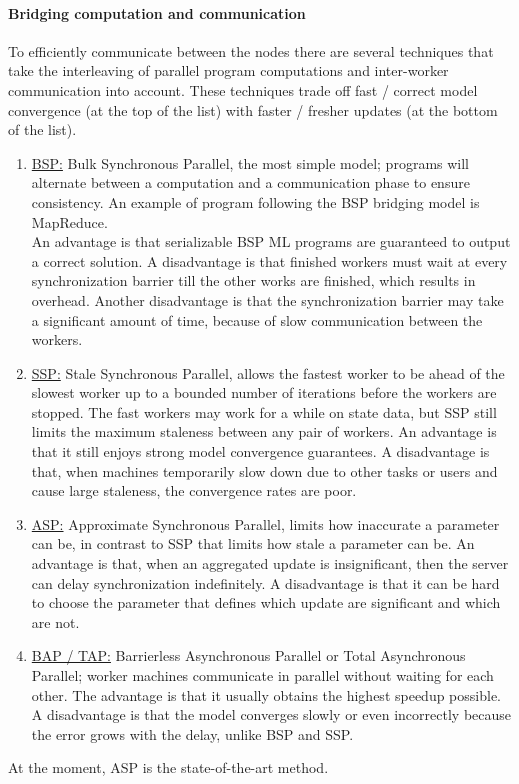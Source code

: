 \paragraph{Bridging computation and communication}
To efficiently communicate between the nodes there are several techniques that take the interleaving of parallel program computations and inter-worker communication into account. These techniques trade off fast / correct model convergence (at the top of the list) with faster / fresher updates (at the bottom of the list).
\begin{enumerate}
	\item \underline{BSP:} Bulk Synchronous Parallel, the most simple model; programs will alternate between a computation and a communication phase to ensure consistency\cite{Xing16}. An example of program following the BSP bridging model is MapReduce.\\
	An advantage is that serializable BSP ML programs are guaranteed to output a correct solution. A disadvantage is that finished workers must wait at every synchronization barrier till the other works are finished, which results in overhead\cite{Chilimbi14}. Another disadvantage is that the synchronization barrier may take a significant amount of time, because of slow communication between the workers.
	\item \underline{SSP:} Stale Synchronous Parallel, allows the fastest worker to be ahead of the slowest worker up to a bounded number of iterations before the workers are stopped. The fast workers may work for a while on state data, but SSP still limits the maximum staleness between any pair of workers. An advantage is that it still enjoys strong model convergence guarantees. A disadvantage is that, when machines temporarily slow down due to other tasks or users and cause large staleness, the convergence rates are poor.
	\item \underline{ASP:} Approximate Synchronous Parallel, limits how inaccurate a parameter can be, in contrast to SSP that limits how stale a parameter can be. An advantage is that, when an aggregated update is insignificant, then the server can delay synchronization indefinitely. A disadvantage is that it can be hard to choose the parameter that defines which update are significant and which are not. \cite{Hsieh17}
	\item \underline{BAP / TAP:} Barrierless Asynchronous Parallel\cite{Han15} or Total Asynchronous Parallel\cite{Hsieh17}; worker machines communicate in parallel without waiting for each other. The advantage is that it usually obtains the highest speedup possible. A disadvantage is that the model converges slowly or even incorrectly because the error grows with the delay, unlike BSP and SSP. \cite{Han15}
\end{enumerate}
At the moment, ASP is the state-of-the-art method.


